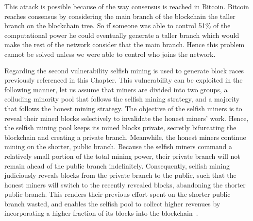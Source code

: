
This attack is possible because of the way consensus is reached in Bitcoin. Bitcoin reaches consensus by considering the main branch of the blockchain the taller branch on the blockchain tree. So if someone was able to control 51\% of the computational power he could eventually generate a taller branch which would make the rest of the network consider that the main branch. Hence this problem cannot be solved unless we were able to control who joins the network.



\label{sec:selfish}
Regarding the second vulnerability selfish mining is used to generate block races previously referenced in this Chapter. This vulnerability can be exploited in the following manner, let us assume that miners are divided into two groups, a colluding minority pool that follows the selfish mining strategy, and a majority that follows the honest mining strategy. The objective of the selfish miners is to reveal their mined blocks selectively to invalidate the honest miners’ work. Hence, the selfish mining pool keeps its mined blocks private, secretly bifurcating the blockchain and creating a private branch. Meanwhile, the honest miners continue mining on the shorter, public branch. Because the selfish miners command a relatively small portion of the total mining power, their private branch will not remain ahead of the public branch indefinitely. Consequently, selfish mining judiciously reveals blocks from the private branch to the public, such that the honest miners will switch to the recently revealed blocks, abandoning the shorter public branch. This renders their previous effort spent on the shorter public branch wasted, and enables the selfish pool to collect higher revenues by incorporating a higher fraction of its blocks into the blockchain~\cite{eyal2018majority}.


